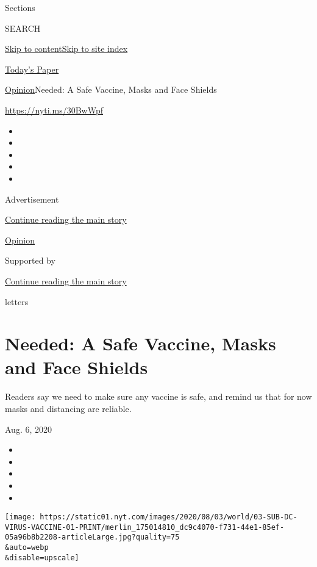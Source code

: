 Sections

SEARCH

\protect\hyperlink{site-content}{Skip to
content}\protect\hyperlink{site-index}{Skip to site index}

\href{https://myaccount.nytimes.com/auth/login?response_type=cookie\&client_id=vi}{}

\href{https://www.nytimes.com/section/todayspaper}{Today's Paper}

\href{/section/opinion}{Opinion}\textbar{}Needed: A Safe Vaccine, Masks
and Face Shields

\href{https://nyti.ms/30BwWpf}{https://nyti.ms/30BwWpf}

\begin{itemize}
\item
\item
\item
\item
\item
\end{itemize}

Advertisement

\protect\hyperlink{after-top}{Continue reading the main story}

\href{/section/opinion}{Opinion}

Supported by

\protect\hyperlink{after-sponsor}{Continue reading the main story}

letters

\hypertarget{needed-a-safe-vaccine-masks-and-face-shields}{%
\section{Needed: A Safe Vaccine, Masks and Face
Shields}\label{needed-a-safe-vaccine-masks-and-face-shields}}

Readers say we need to make sure any vaccine is safe, and remind us that
for now masks and distancing are reliable.

Aug. 6, 2020

\begin{itemize}
\item
\item
\item
\item
\item
\end{itemize}

\texttt{[image: https://static01.nyt.com/images/2020/08/03/world/03-SUB-DC-VIRUS-VACCINE-01-PRINT/merlin\_175014810\_dc9c4070-f731-44e1-85ef-05a96b8b2208-articleLarge.jpg?quality=75\\\&auto=webp\\\&disable=upscale]}

